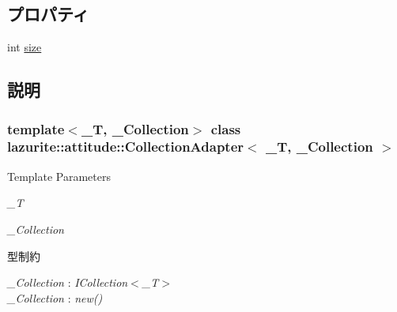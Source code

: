 \subsection*{プロパティ}
\begin{DoxyCompactItemize}
\item 
int \hyperlink{classlazurite_1_1attitude_1_1_collection_adapter_3_01___t_00_01___collection_01_4_af83328925da0e124e09bcc013fa9f2f1}{size}
\end{DoxyCompactItemize}


\subsection{説明}
\subsubsection*{template$<$\_\-T, \_\-Collection$>$ class lazurite::attitude::CollectionAdapter$<$ \_\-T, \_\-Collection $>$}


\begin{DoxyTemplParams}{Template Parameters}
\item[{\em \_\-T}]\item[{\em \_\-Collection}]\end{DoxyTemplParams}
\begin{Desc}
\item[型制約]\begin{description}
\item[{\em \_\-Collection} : {\em ICollection$<$\_\-T$>$}]\item[{\em \_\-Collection} : {\em new()}]\end{description}
\end{Desc}


